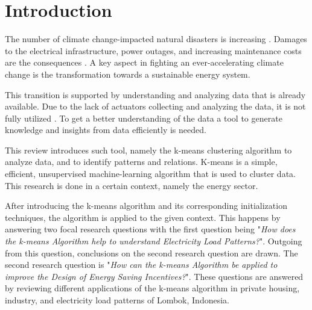 \section{Introduction}
\label{cha:introduction}


The number of climate change-impacted natural disasters is increasing \cite{JES-IND}.
Damages to the electrical infrastructure, power outages, and increasing maintenance costs are the consequences \cite{FAN-CCI}.
A key aspect in fighting an ever-accelerating climate change is the transformation towards a sustainable energy system.

This transition is supported by understanding and analyzing data that is already available.
Due to the lack of actuators collecting and analyzing the data, it is not fully utilized \cite{LIU-BDE}.
To get a better understanding of the data a tool to generate knowledge and insights from data efficiently is needed.

This review introduces such tool, namely the k-means clustering algorithm to analyze data, and to identify patterns and relations.
K-means is a simple, efficient, unsupervised machine-learning algorithm that is used to cluster data.
This research is done in a certain context, namely the energy sector.

After introducing the k-means algorithm and its corresponding initialization techniques, the algorithm is applied to the given context.
This happens by answering two focal research questions with the first question being "\textit{How does the k-means Algorithm help to understand Electricity Load Patterns?}".
Outgoing from this question, conclusions on the second research question are drawn.
The second research question is "\textit{How can the k-means Algorithm be applied to improve the Design of Energy Saving Incentives?}".
These questions are answered by reviewing different applications of the k-means algorithm in private housing, industry, and electricity load patterns of Lombok, Indonesia.


